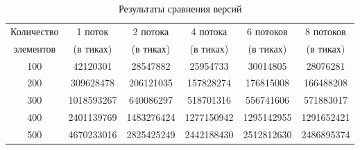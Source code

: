 \documentclass[a4paper, 14pt]{article}
\begin{document}
     
    \begin{table}[h]
        \caption{Результаты сравнения версий}
            \begin{tabular}{ | c | c | c | c | c | c | }
                \hline
                 Количество   &  1 поток   &  2 потока  &  4 потока &  6 потоков  &  8 потоков \\
                 элементов &  (в тиках) & (в тиках) & (в тиках) & (в тиках) & (в тиках) \\ \hline  
                  100 &    42120301  &    28547882  &    25954733  &    30014805  &    28076281 \\
                200 &    309628478  &    206121035  &    157828274  &    176815008  &    166488208 \\
                300 &    1018593267  &    640086297  &    518701316  &    556741606  &    571883017 \\
                400 &    2401139769  &    1483276424  &    1277150942  &    1295142955  &    1291652421 \\
                500 &    4670233016  &    2825425249  &    2442188430  &    2512812630  &    2486895374 \\
                \hline
            \end{tabular}
        \label{tab:time}
    \end{table} 
    
\end{document}
